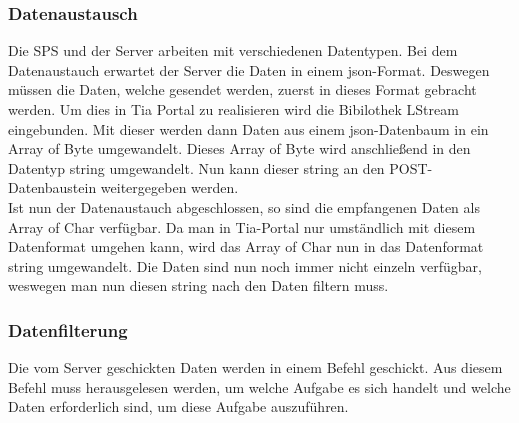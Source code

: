     \subsubsection{Datenaustausch}
    \label{Datenaustausch}
    Die SPS und der Server arbeiten mit verschiedenen Datentypen. Bei dem Datenaustauch erwartet der Server die Daten in einem json-Format. Deswegen müssen die Daten, welche gesendet werden, zuerst in dieses Format gebracht werden. Um dies in Tia Portal zu realisieren wird die Bibilothek LStream eingebunden. Mit dieser werden dann Daten aus einem json-Datenbaum in ein Array of Byte umgewandelt. Dieses Array of Byte wird anschließend in den Datentyp string umgewandelt. Nun kann dieser string an den POST-Datenbaustein weitergegeben werden. \\
    Ist nun der Datenaustauch abgeschlossen, so sind die empfangenen Daten als Array of Char verfügbar. Da man in Tia-Portal nur umständlich mit diesem Datenformat umgehen kann, wird das Array of Char nun in das Datenformat string umgewandelt. Die Daten sind nun noch immer nicht einzeln verfügbar, weswegen man nun diesen string nach den Daten filtern muss.

    \subsubsection{Datenfilterung}
    Die vom Server geschickten Daten werden in einem Befehl geschickt. Aus diesem Befehl muss herausgelesen werden, um welche Aufgabe es sich handelt  und welche Daten erforderlich sind, um diese Aufgabe auszuführen.

